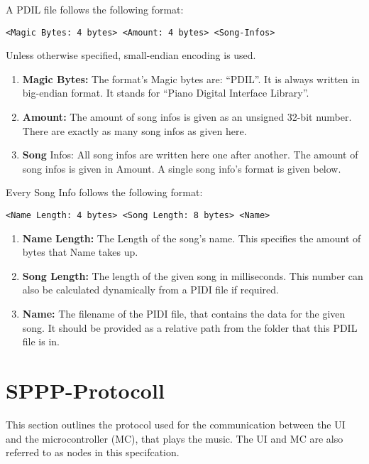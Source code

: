 A PDIL file follows the following format:

\begin{verbatim}
<Magic Bytes: 4 bytes> <Amount: 4 bytes> <Song-Infos>
\end{verbatim}

Unless otherwise specified, small-endian encoding is used.

\begin{enumerate}
	\item \textbf{Magic Bytes:} The format's Magic bytes are: \enquote{PDIL}. It is always written in big-endian format. It stands for \enquote{Piano Digital Interface Library}.
	\item \textbf{Amount:} The amount of song infos is given as an unsigned 32-bit number. There are exactly as many song infos as given here.
	\item \textbf{Song }Infos: All song infos are written here one after another. The amount of song infos is given in Amount. A single song info's format is given below.
\end{enumerate}

Every Song Info follows the following format:

\begin{verbatim}
<Name Length: 4 bytes> <Song Length: 8 bytes> <Name>
\end{verbatim}

\begin{enumerate}
    \item \textbf{Name Length:} The Length of the song's name. This specifies the amount of bytes that Name takes up.
    \item \textbf{Song Length:} The length of the given song in milliseconds. This number can also be calculated dynamically from a PIDI file if required.
    \item \textbf{Name:} The filename of the PIDI file, that contains the data for the given song. It should be provided as a relative path from the folder that this PDIL file is in.
\end{enumerate}


\section{\ac{SPPP}-Protocoll} \label{appendix-sppp}

This section outlines the protocol used for the communication between the UI and the microcontroller (MC), that plays the music. The UI and MC are also referred to as nodes in this specifcation.

